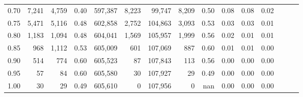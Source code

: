 \begin{tabular}{rrrrrrrrrrrrrrr}
0.70 &    7,241 &   4,759 &  0.40 &  597,387 &    8,223 &   99,747 &    8,209 &  0.50 &  0.08 &  0.08 &      0.02 \\
0.75 &    5,471 &   5,116 &  0.48 &  602,858 &    2,752 &  104,863 &    3,093 &  0.53 &  0.03 &  0.03 &      0.01 \\
0.80 &    1,183 &   1,094 &  0.48 &  604,041 &    1,569 &  105,957 &    1,999 &  0.56 &  0.02 &  0.01 &      0.01 \\
0.85 &      968 &   1,112 &  0.53 &  605,009 &      601 &  107,069 &      887 &  0.60 &  0.01 &  0.01 &      0.00 \\
0.90 &      514 &     774 &  0.60 &  605,523 &       87 &  107,843 &      113 &  0.56 &  0.00 &  0.00 &      0.00 \\
0.95 &       57 &      84 &  0.60 &  605,580 &       30 &  107,927 &       29 &  0.49 &  0.00 &  0.00 &      0.00 \\
1.00 &       30 &      29 &  0.49 &  605,610 &        0 &  107,956 &        0 &   nan &  0.00 &  0.00 &      0.00 \\
\bottomrule
\end{tabular}
